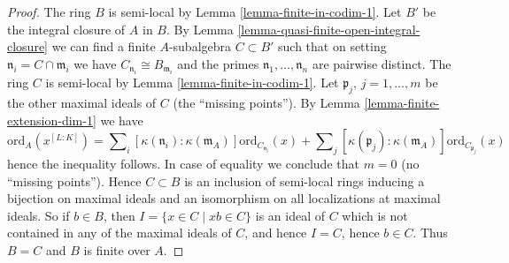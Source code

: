 \documentclass[10pt,a4paper]{amsart}
\theoremstyle{plain}
\theoremstyle{definition}
\theoremstyle{remark}
\numberwithin{equation}{subsection}
\begin{document}
\begin{proof}
The ring $B$ is semi-local by Lemma \ref{lemma-finite-in-codim-1}.
Let $B'$ be the integral closure of $A$ in $B$. By
Lemma \ref{lemma-quasi-finite-open-integral-closure}
we can find a finite $A$-subalgebra $C \subset B'$ such that
on setting $\mathfrak n_i = C \cap \mathfrak m_i$ we have
$C_{\mathfrak n_i} \cong B_{\mathfrak m_i}$ and the primes
$\mathfrak n_1, \ldots, \mathfrak n_n$ are pairwise distinct.
The ring $C$ is semi-local by Lemma \ref{lemma-finite-in-codim-1}.
Let $\mathfrak p_j$, $j = 1, \ldots, m$ be the other maximal
ideals of $C$ (the ``missing points''). By
Lemma \ref{lemma-finite-extension-dim-1} we have
$$
\text{ord}_A(x^{[L : K]}) =
\sum\nolimits_i
[\kappa(\mathfrak n_i) : \kappa(\mathfrak m_A)]
\text{ord}_{C_{\mathfrak n_i}}(x)
+
\sum\nolimits_j
[\kappa(\mathfrak p_j) : \kappa(\mathfrak m_A)]
\text{ord}_{C_{\mathfrak p_j}}(x)
$$
hence the inequality follows. In case of equality we conclude that
$m = 0$ (no ``missing points''). Hence $C \subset B$ is an inclusion
of semi-local rings inducing a bijection on maximal ideals and
an isomorphism on all localizations at maximal ideals. So if $b \in B$,
then $I = \{x \in C \mid xb \in C\}$ is an ideal of $C$ which is not
contained in any of the maximal ideals of $C$, and hence $I = C$,
hence $b \in C$. Thus $B = C$ and $B$ is finite over $A$.
\end{proof}
\end{document}
